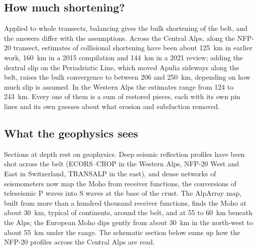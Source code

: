\subsection*{How much shortening?}

Applied to whole transects, balancing gives the bulk shortening of the belt, and the answers
differ with the assumptions. Across the Central Alps, along the NFP-20 transect, estimates
of collisional shortening have been about \qty{125}{km} in earlier work, \qty{160}{km} in
a 2015 compilation and \qty{144}{km} in a 2021 review; adding the dextral slip on the Periadriatic Line, which
moved Apulia sideways along the belt, raises the bulk convergence to between 206 and
\qty{250}{km}, depending on how much slip is assumed. In the Western Alps the estimates
range from 124 to \qty{243}{km}. Every one of them is a sum of restored pieces, each with
its own pin lines and its own guesses about what erosion and subduction removed.

\subsection*{What the geophysics sees}

Sections at depth rest on geophysics. Deep seismic reflection profiles have been shot
across the belt (ECORS--CROP in the Western Alps, NFP-20 West and East in
Switzerland, TRANSALP in the east), and dense networks of seismometers now map the Moho
from receiver functions, the conversions of teleseismic P waves into S waves at the base of
the crust. The AlpArray map, built from more than a hundred thousand receiver functions,
finds the Moho at about \qty{30}{km}, typical of continents, around the belt, and at 55 to
\qty{60}{km} beneath the Alps; the European Moho dips gently from about \qty{30}{km} in the
north-west to about \qty{55}{km} under the range.
The schematic section below sums up how the NFP-20 profiles across the Central Alps are
read.


